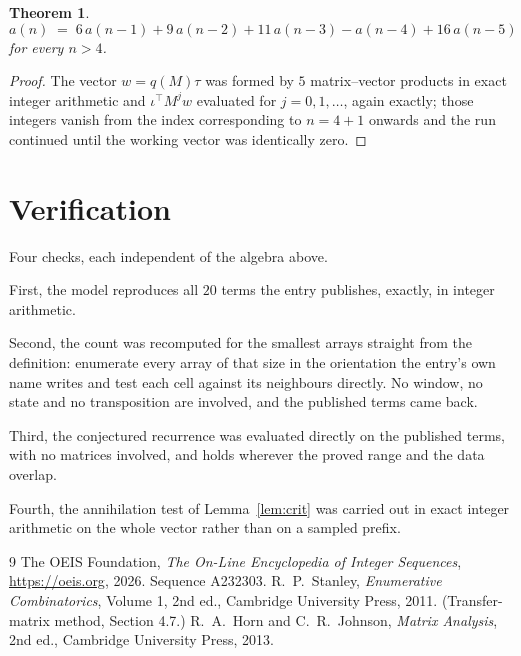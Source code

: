 \documentclass[11pt,a4paper]{article}
\theoremstyle{plain}
\newtheorem{theorem}{Theorem}
\theoremstyle{definition}
\begin{document}
\begin{theorem}
\[
a(n)\;=\;6\,a(n-1) + 9\,a(n-2) + 11\,a(n-3) - a(n-4) + 16\,a(n-5)
\]
for every $n>4$.
\end{theorem}

\begin{proof}
The vector $w=q(M)\tau$ was formed by $5$ matrix--vector products in exact integer
arithmetic and $\iota^{\!\top}M^{j}w$ evaluated for $j=0,1,\dots$, again exactly; those
integers vanish from the index corresponding to $n=4+1$ onwards and the run continued
until the working vector was identically zero.
\end{proof}

\section{Verification}

Four checks, each independent of the algebra above.

First, the model reproduces all $20$ terms the entry publishes, exactly, in integer
arithmetic.

Second, the count was recomputed for the smallest arrays straight from the definition:
enumerate every array of that size in the orientation the entry's own name writes and test each
cell against its neighbours directly. No window, no state and no transposition are involved,
and the published terms came back.

Third, the conjectured recurrence was evaluated directly on the published terms, with no
matrices involved, and holds wherever the proved range and the data overlap.

Fourth, the annihilation test of Lemma~\ref{lem:crit} was carried out in exact integer
arithmetic on the whole vector rather than on a sampled prefix.

\begin{thebibliography}{9}
 The OEIS Foundation, \emph{The On-Line Encyclopedia of Integer
Sequences}, \url{https://oeis.org}, 2026. Sequence A232303.
 R.~P.~Stanley, \emph{Enumerative Combinatorics}, Volume 1, 2nd ed.,
Cambridge University Press, 2011. (Transfer-matrix method, Section 4.7.)
 R.~A.~Horn and C.~R.~Johnson, \emph{Matrix Analysis}, 2nd ed., Cambridge
University Press, 2013.
\end{thebibliography}
\end{document}

